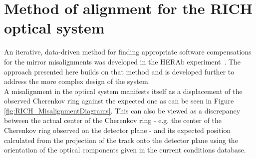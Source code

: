\section{Method of alignment for the RICH optical system}
\label{sec:MirrorAlignmentMethod}

An iterative, data-driven method for finding appropriate software compensations for the mirror misalignments was developed in the HERAb experiment~\cite{Gorisek:1999td}. The approach presented here builds on that method and is developed further to address the more complex design of the \lhcb \rich system.\\

A misalignment in the \lhcb \rich optical system manifests itself as a displacement of the observed Cherenkov ring against the expected one \cite{Papanestis:2008zz, Baldini:2006ed} as can be seen in Figure \ref{fig:RICH_MisalignmentDiagrams}. This can also be viewed as a discrepancy between the actual center of the Cherenkov ring - e.g. the center of the Cherenkov ring observed on the detector plane -  and its expected position calculated from the projection of the track onto the detector plane using the orientation of the optical components given in the current \lhcb conditions database. 

